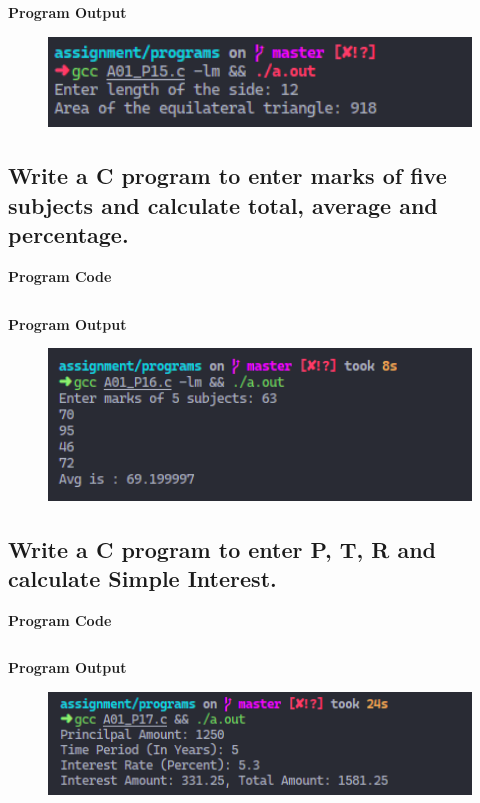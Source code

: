 \documentclass[a4paper, onecolumn]{article}
\begin{document}
\inputminted{C}{programs/A01_P15.c}

\textbf{Program Output}

\begin{figure}[h]
  \includegraphics[width=12cm]{A01_P15}
\end{figure}

\newpage



\subsection{Write a C program to enter marks of five subjects and calculate total, average and percentage.}
\textbf{Program Code}

\inputminted{C}{programs/A01_P16.c}

\textbf{Program Output}

\begin{figure}[h]
  \includegraphics[width=12cm]{A01_P16}
\end{figure}

\newpage



\subsection{Write a C program to enter P, T, R and calculate Simple Interest.}
\textbf{Program Code}

\inputminted{C}{programs/A01_P17.c}

\textbf{Program Output}

\begin{figure}[h]
  \includegraphics[width=12cm]{A01_P17}
\end{figure}
\end{document}

